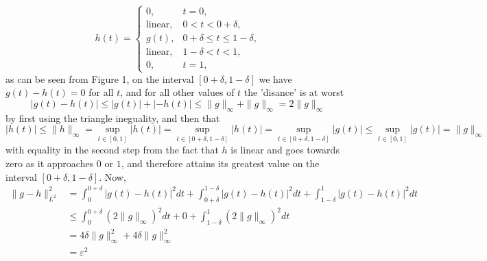 \documentclass[../thesis.tex]{subfiles}
\begin{document}
\begin{equation*}
    h(t) = 
    \begin{cases} 0, &  t=0,\\  
        \text{linear}, &  0<t<0+\delta,\\ 
        g(t), & 0+\delta \leq t \leq 1-\delta,\\ 
        \text{linear}, &  1-\delta <t<1,\\ 
        0, &  t=1,
    \end{cases}
\end{equation*}
as can be seen from Figure 1, on the interval $[0+\delta, 1-\delta]$ we have $g(t)-h(t)= 0$ for all $t$, and for all other values of $t$ the 'disance' is at worst 
\begin{equation*}
    \left|g(t)-h(t) \right| \leq |g(t)| + |-h(t)| \leq \|g \|_{\infty} + \|g \|_{\infty} = 2 \|g \|_{\infty}
\end{equation*}
by first using the triangle ineguality, and then that
\begin{equation*}
    |h(t)| \leq \|h\|_{\infty} = \sup_{t\in[0,1]} |h(t)| = \sup_{t\in[0+\delta, 1-\delta]} |h(t)| = \sup_{t\in[0+\delta, 1-\delta]} |g(t)| \leq \sup_{t\in[0, 1]} |g(t)| =\| g\|_{\infty}
\end{equation*}
with equality in the second step from the fact that $h$ is linear and goes towards zero as it approaches $0$ or $1$, and therefore attains its greatest value on the interval $[0+\delta,1-\delta]$. Now,
\begin{align*}
    \| g-h \|_{L^2}^2 &=  \int_0^{0+\delta} \left|g(t)-h(t) \right|^2dt + \int_{0+\delta}^{1-\delta} \left|g(t)-h(t) \right|^2dt +\int_{1-\delta}^{1} \left|g(t)-h(t) \right|^2dt\\ 
    &\leq \int_0^{0+\delta} (2 \| g\|_\infty)^2dt + 0 +\int_{1-\delta}^{1} (2 \| g\|_\infty)^2dt\\
    &=  4 \delta \| g\|_\infty^2 + 4 \delta \| g\|_\infty^2\\ 
    &= \varepsilon^2
\end{align*}
\end{document}
